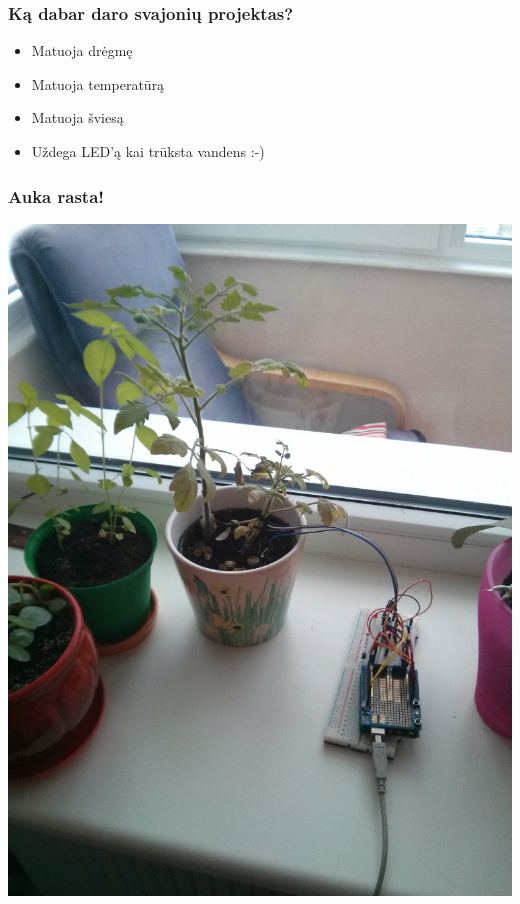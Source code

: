 \documentclass[12pt,a4paper]{beamer}
\begin{document}
\begin{frame}
    \frametitle{Ką dabar daro svajonių projektas?}

    \begin{itemize}
        \item Matuoja drėgmę
        \item Matuoja temperatūrą
        \item Matuoja šviesą
        \item Uždega LED'ą kai trūksta vandens :-)
    \end{itemize}
    
\end{frame}

\begin{frame}
    \frametitle{Auka rasta!}
    \begin{center}
        \includegraphics[scale=0.2]{img/pomidoras.jpg}
    \end{center}
\end{frame}
\end{document}
